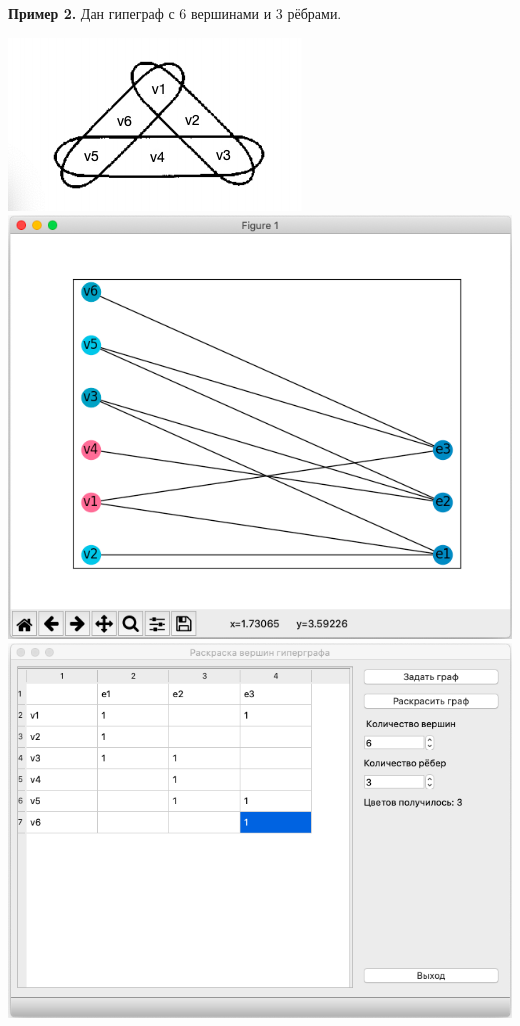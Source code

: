 \documentclass[12pt,a4paper]{article}
\begin{document}
\textbf{Пример 2.} Дан гипеграф с 6 вершинами и 3 рёбрами.
\begin{center}
   \includegraphics[scale=0.8]{sample-2_1.png} \\
   \includegraphics[scale=0.6]{sample-2_2.png}
   \includegraphics[scale=0.6]{sample-2_3.png}
\end{center}
\end{document}
